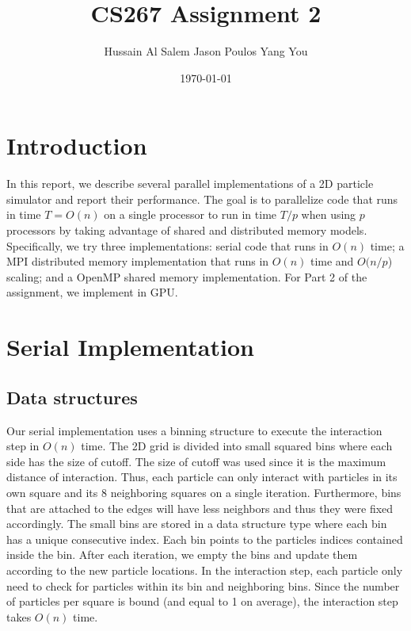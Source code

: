 \documentclass[12pt]{article}
\begin{document}
\title{CS267 Assignment 2}
\date{\today}
\author{Hussain Al Salem \hspace{5mm} Jason Poulos \hspace{5mm} Yang You \vspace{10mm}}
\maketitle

\section{Introduction}

In this report, we describe several parallel implementations of a 2D particle simulator and report their performance. The goal is to parallelize code that runs in time $T = O(n)$ on a single processor to run in time $T/p$ when using $p$ processors by taking advantage of shared and distributed memory models. Specifically, we try three implementations: serial code that runs in $O(n)$ time; a MPI distributed memory implementation that runs in $O(n)$ time and $O(n/p$) scaling; and a OpenMP shared memory implementation. For Part 2 of the assignment, we implement in GPU. 

\section{Serial Implementation}

\subsection{Data structures}
Our serial implementation uses a binning structure to execute the interaction step in $O(n)$ time. The 2D grid is divided into small squared bins where each side has the size of cutoff. The size of cutoff was used since it is the maximum distance of interaction. Thus, each particle can only interact with particles in its own square and its 8 neighboring squares on a single iteration. Furthermore, bins that are attached to the edges will have less neighbors and thus they were fixed accordingly. The small bins are stored in a data structure type where each bin has a unique consecutive index. Each bin points to the particles indices contained inside the bin. After each iteration, we empty the bins and update them according to the new particle locations. In the interaction step, each particle only need to check for particles within its bin and neighboring bins. Since the number of particles per square is bound (and equal to 1 on average), the interaction step takes $O(n)$ time.
\end{document}
